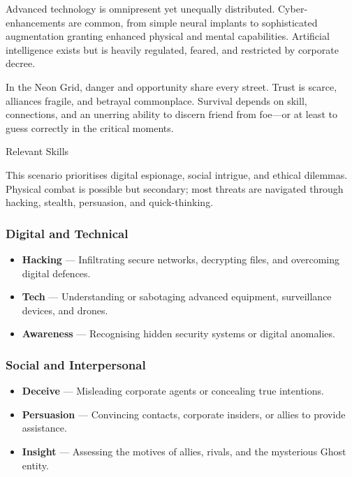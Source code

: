 Advanced technology is omnipresent yet unequally distributed. Cyber-enhancements are common, from simple neural implants to sophisticated augmentation granting enhanced physical and mental capabilities. Artificial intelligence exists but is heavily regulated, feared, and restricted by corporate decree.

In the Neon Grid, danger and opportunity share every street. Trust is scarce, alliances fragile, and betrayal commonplace. Survival depends on skill, connections, and an unerring ability to discern friend from foe—or at least to guess correctly in the critical moments.



\begin{CommentBox}{Relevant Skills}\raggedright
    This scenario prioritises digital espionage, social intrigue, and ethical dilemmas. Physical combat is possible but secondary; most threats are navigated through hacking, stealth, persuasion, and quick-thinking.

    \vspace{0.5\baselineskip}

    \subsubsection*{Digital and Technical}
    \begin{itemize}
        \item \textbf{Hacking} — Infiltrating secure networks, decrypting files, and overcoming digital defences.
        \item \textbf{Tech} — Understanding or sabotaging advanced equipment, surveillance devices, and drones.
        \item \textbf{Awareness} — Recognising hidden security systems or digital anomalies.
    \end{itemize}

    \subsubsection*{Social and Interpersonal}
    \begin{itemize}
        \item \textbf{Deceive} — Misleading corporate agents or concealing true intentions.
        \item \textbf{Persuasion} — Convincing contacts, corporate insiders, or allies to provide assistance.
        \item \textbf{Insight} — Assessing the motives of allies, rivals, and the mysterious Ghost entity.
    \end{itemize}


\end{CommentBox}

